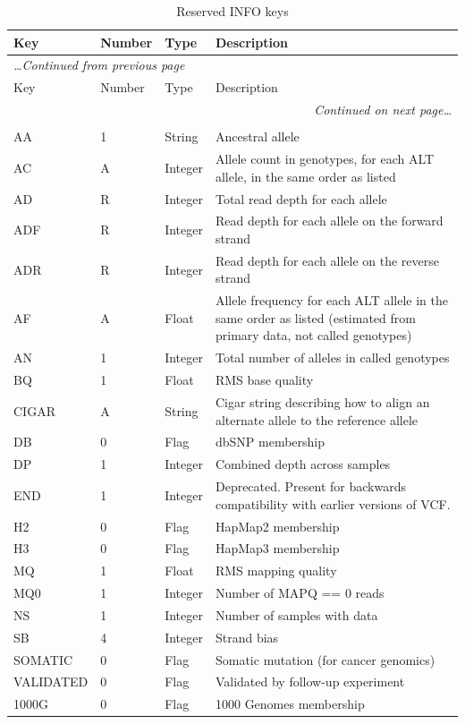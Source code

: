 \documentclass[8pt]{article}
\begin{document}
\begin{longtable}[c]{ | p{2.5cm} | p{1.5cm} | p{1.5cm} | p{10.3cm} | }
	\hline
	Key		& Number	& Type		& Description \\ \hline
  \endfirsthead
	\multicolumn{4}{l}{\small\emph{\ldots Continued from previous page}} \\[0.7ex]
	\hline
	Key		& Number	& Type		& Description \\ \hline
  \endhead
	\hline
	\multicolumn{4}{r}{\small\emph{Continued on next page\ldots}} \\
	\caption[]{Reserved INFO keys}
  \endfoot
	\hline
	\multicolumn{4}{l}{} \\
	\caption{Reserved INFO keys}
	\label{table:reserved-info}
  \endlastfoot
	AA		& 1		& String	& Ancestral allele \\
	AC		& A		& Integer	& Allele count in genotypes, for each ALT allele, in the same order as listed  \\
	AD		& R		& Integer	& Total read depth for each allele \\
	ADF		& R		& Integer	& Read depth for each allele on the forward strand \\
	ADR		& R		& Integer	& Read depth for each allele on the reverse strand \\
	AF		& A		& Float		& Allele frequency for each ALT allele in the same order as listed (estimated from primary data, not called genotypes) \\
	AN		& 1		& Integer	& Total number of alleles in called genotypes \\
	BQ   		& 1		& Float		& RMS base quality \\
	CIGAR		& A		& String	& Cigar string describing how to align an alternate allele to the reference allele \\
	DB		& 0		& Flag		& dbSNP membership \\
	DP		& 1		& Integer	& Combined depth across samples \\
	END		& 1		& Integer	& Deprecated. Present for backwards compatibility with earlier versions of VCF. \\
	H2		& 0		& Flag		& HapMap2 membership \\
	H3		& 0		& Flag		& HapMap3 membership \\
	MQ		& 1		& Float		& RMS mapping quality \\
	MQ0   		& 1		& Integer	& Number of MAPQ == 0 reads \\
	NS		& 1		& Integer	& Number of samples with data \\
	SB		& 4		& Integer	& Strand bias \\
	SOMATIC		& 0		& Flag		& Somatic mutation (for cancer genomics) \\
	VALIDATED	& 0		& Flag		& Validated by follow-up experiment \\
	1000G		& 0		& Flag		& 1000 Genomes membership \\
\end{longtable}
\end{document}

